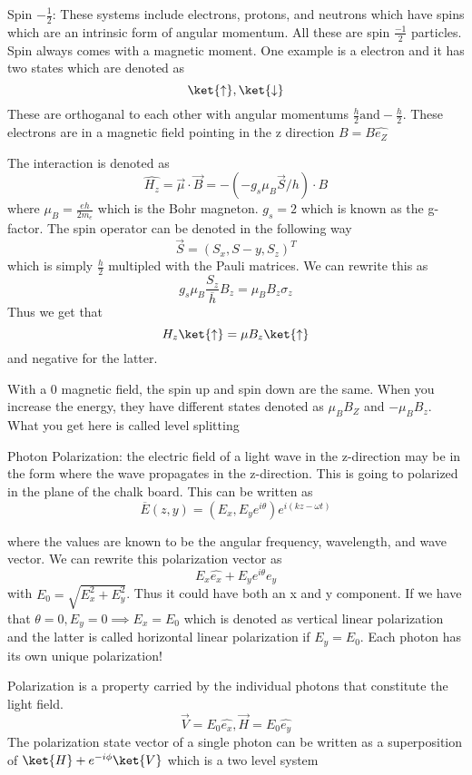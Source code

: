 \begin{eg}
    Spin \(-\frac{1}{2}\): These systems include electrons, protons, and neutrons
    which have spins which are an intrinsic form of angular momentum. All these
    are spin \(\frac{-1}{2}  \)  particles. Spin always comes with a magnetic moment. 
    One example is a electron and it has two states which are denoted as 
    \[
      \ket{\uparrow}, \ket{\downarrow}
    \]
    These are orthoganal to each other with angular momentums \(\frac{h}{2} \text{and} -\frac{h}{2}\). 
    These electrons are in a magnetic field pointing in the z direction \(B = B \hat{e_Z}\)
    
    The interaction is denoted as 
    \[
      \hat{H_z} = \vec{\mu} \cdot \vec{B} = - (-g_s \mu_B \vec{S}/h)\cdot B
    \]
    where \(\mu_B = \frac{eh}{2m_e}\) which is the Bohr magneton. \(g_s =2  \)   
    which is known as the g-factor. The spin operator can be denoted in the following way
    \[
      \vec{S} = ( S_x, S-y, S_z)^T
    \]
    which is simply \(\frac{h}{2} \)  multipled with the Pauli matrices. We can rewrite this as 
    \[
      g_s \mu_B \frac{S_z}{\overline{h} } B_z = \mu_B B_z \sigma_z
    \]
    Thus we get that 
    \[
      H_z \ket{\uparrow} = \mu B_z \ket{\uparrow}
    \]
    and negative for the latter.

    With a 0 magnetic field, the spin up and spin down are the same. When you increase the energy,
    they have different states denoted as \(\mu_B B_Z\) and \(-\mu_B B_z\). 
    What you get here is called level splitting
\end{eg}

\begin{eg}
Photon Polarization: the electric field of a light wave in the z-direction may be 
in the form where the wave propagates in the z-direction. This is going to polarized
in the plane of the chalk board. This can be written as 
\[
  \overline{E} (z,y) = (E_x, E_y e^{i \theta }) e^{i(kz-\omega t)}
\]

where the values are known to be the angular frequency, wavelength, and wave vector.
We can rewrite this polarization vector as 
\[
  E_x \hat{e_x} + E_y e^{i \theta } e_y 
\]
with \( E_0 = \sqrt{E_x ^{2}  + E_y ^{2} } \). Thus it could have both an x and y component. 
If we have that \(\theta  = 0 , E_y = 0 \implies E_x = E_0\)  which is 
denoted as vertical linear polarization and the latter is called horizontal linear 
polarization if \( E_y = E_0\). Each photon has its own unique polarization! 

Polarization is a property carried by the individual photons that constitute the light field. 
\[
  \vec{V} = E_0 \hat{e_x}, \vec{H} = E_0 \hat{e_y}
\]
The polarization state vector of a single photon can be written as a superposition of 
\( \ket{H} + e^{-i \phi } \ket{V}\) which is a two level system 
\end{eg}

